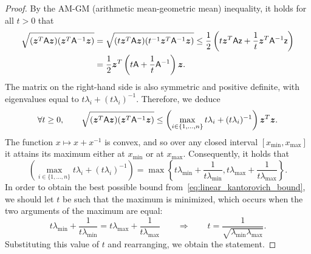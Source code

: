 \begin{proof}
    By the AM-GM (arithmetic mean-geometric mean) inequality,
    it holds for all $t > 0$ that
    \begin{align*}
        \sqrt{(\mathbf{\boldsymbol{z}}^T \mathsf A \mathbf{\boldsymbol{z}}) (\mathbf{\boldsymbol{z}}^T \mathsf A^{-1} \mathbf{\boldsymbol{z}})}
        &= \sqrt{(t\mathbf{\boldsymbol{z}}^T \mathsf A \mathbf{\boldsymbol{z}}) (t^{-1} \mathbf{\boldsymbol{z}}^T \mathsf A^{-1} \mathbf{\boldsymbol{z}})}
        \leq \frac{1}{2} \left( t \mathbf{\boldsymbol{z}}^T \mathsf A \mathsf z + \frac{1}{t} \mathbf{\boldsymbol{z}}^T \mathsf A^{-1} \mathsf z \right) \\
        &= \frac{1}{2} \mathbf{\boldsymbol{z}}^T \left( t \mathsf A + \frac{1}{t} \mathsf A^{-1} \right) \mathbf{\boldsymbol{z}}.
    \end{align*}
    The matrix on the right-hand side is also symmetric and positive definite,
    with eigenvalues equal to $t \lambda_i + (t \lambda_i)^{-1}$.
    Therefore, we deduce
    \begin{equation}
        \label{eq:linear_kantorovich_bound}
        \forall t \geq 0, \qquad
        \sqrt{(\mathbf{\boldsymbol{z}}^T \mathsf A \mathbf{\boldsymbol{z}}) (\mathbf{\boldsymbol{z}}^T \mathsf A^{-1} \mathbf{\boldsymbol{z}})}
        \leq \left( \max_{i \in \{1, \dotsc, n\}} t \lambda_i + (t \lambda_i)^{-1} \right) \mathbf{\boldsymbol{z}}^T \mathbf{\boldsymbol{z}}.
    \end{equation}
    The function $x \mapsto x + x^{-1}$ is convex,
    and so over any closed interval $[x_{\min}, x_{\max}]$
    it attains its maximum either at $x_{\min}$ or at $x_{\max}$.
    Consequently, it holds that
    \[
        \left( \max_{i \in \{1, \dotsc, n\}} t \lambda_i + (t \lambda_i)^{-1} \right)
        = \max \left\{ t \lambda_{\min} + \frac{1}{t \lambda_{\min}}, t \lambda_{\max} + \frac{1}{t \lambda_{\max}} \right\}.
    \]
    In order to obtain the best possible bound from~\eqref{eq:linear_kantorovich_bound},
    we should let $t$ be such that the maximum is minimized,
    which occurs when the two arguments of the maximum are equal:
    \[
            t \lambda_{\min} + \frac{1}{t \lambda_{\min}} = t \lambda_{\max} + \frac{1}{t \lambda_{\max}}
            \qquad \Rightarrow \qquad t = \frac{1}{\sqrt{\lambda_{\min} \lambda_{\max}}}.
    \]
    Substituting this value of $t$ and rearranging,
    we obtain the statement.
\end{proof}


